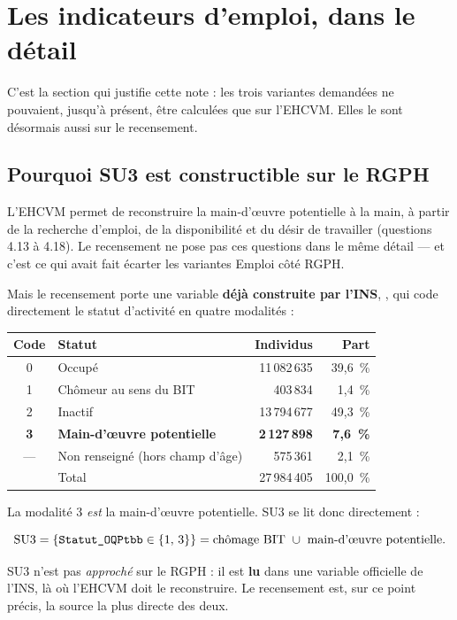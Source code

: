 \documentclass[11pt,a4paper]{article}
\begin{document}
\section{Les indicateurs d'emploi, dans le détail}

C'est la section qui justifie cette note : les trois variantes demandées ne pouvaient, jusqu'à
présent, être calculées que sur l'EHCVM. Elles le sont désormais aussi sur le recensement.

\subsection{Pourquoi SU3 est constructible sur le RGPH}

L'EHCVM permet de reconstruire la main-d'{\oe}uvre potentielle à la main, à partir de la
recherche d'emploi, de la disponibilité et du désir de travailler (questions 4.13 à 4.18). Le
recensement ne pose pas ces questions dans le même détail --- et c'est ce qui avait fait écarter
les variantes Emploi côté RGPH.

Mais le recensement porte une variable \textbf{déjà construite par l'INS},
, qui code directement le statut d'activité en quatre modalités :

\begin{center}
\small
\begin{tabular}{@{}clrr@{}}
\toprule
\textbf{Code} & \textbf{Statut} & \textbf{Individus} & \textbf{Part} \\
\midrule
0 & Occupé & 11\,082\,635 & 39,6~\% \\
1 & Chômeur au sens du BIT & 403\,834 & 1,4~\% \\
2 & Inactif & 13\,794\,677 & 49,3~\% \\
\textbf{3} & \textbf{Main-d'{\oe}uvre potentielle} & \textbf{2\,127\,898} & \textbf{7,6~\%} \\
--- & Non renseigné (hors champ d'âge) & 575\,361 & 2,1~\% \\
\midrule
 & Total & 27\,984\,405 & 100,0~\% \\
\bottomrule
\end{tabular}
\end{center}

La modalité 3 \emph{est} la main-d'{\oe}uvre potentielle. SU3 se lit donc directement :

\[
  \text{SU3} = \{\col{Statut\_OQPtbb} \in \{1,\,3\}\}
  = \text{chômage BIT} \ \cup\ \text{main-d'{\oe}uvre potentielle}.
\]

\begin{retenir}
SU3 n'est pas \emph{approché} sur le RGPH : il est \textbf{lu} dans une variable officielle de
l'INS, là où l'EHCVM doit le reconstruire. Le recensement est, sur ce point précis, la source la
plus directe des deux.
\end{retenir}
\end{document}
